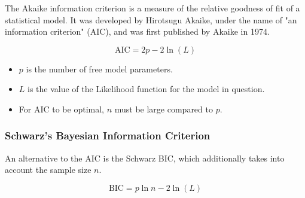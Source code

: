 \documentclass[a4paper,12pt]{article}
\begin{document}
The Akaike information criterion is a measure of the relative goodness of fit of a statistical model. It was developed by Hirotsugu Akaike, under the name of "an information criterion" (AIC), and was first published by Akaike in 1974.
\bigskip

\[\mbox{AIC} = 2p - 2\ln(L)\]

\begin{itemize}
\item $p$ is the number of free model parameters.
\item $L$ is the value of the Likelihood function for the model in question.
\item For AIC to be optimal, $n$ must be large compared to $p$.\\
\end{itemize}
\subsubsection{Schwarz's Bayesian Information Criterion}
An alternative to the AIC is the Schwarz BIC, which additionally takes into account the sample size $n$.

\[\mbox{BIC} = p\ln{n} - 2\ln(L)\]
\end{document}

